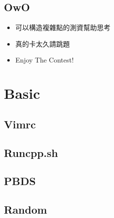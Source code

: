 \documentclass[a4paper,10pt,twocolumn,oneside,x11names]{article}
\begin{document}
\subsection{OwO}
\begin{itemize}[nolistsep]
\item 可以構造複雜點的測資幫助思考
\item 真的卡太久請跳題
\item Enjoy The Contest!
\end{itemize}


\section{Basic}

% 

\subsection{Vimrc}


\subsection{Runcpp.sh}


%

\subsection{PBDS}


\subsection{Random}

\end{document}

